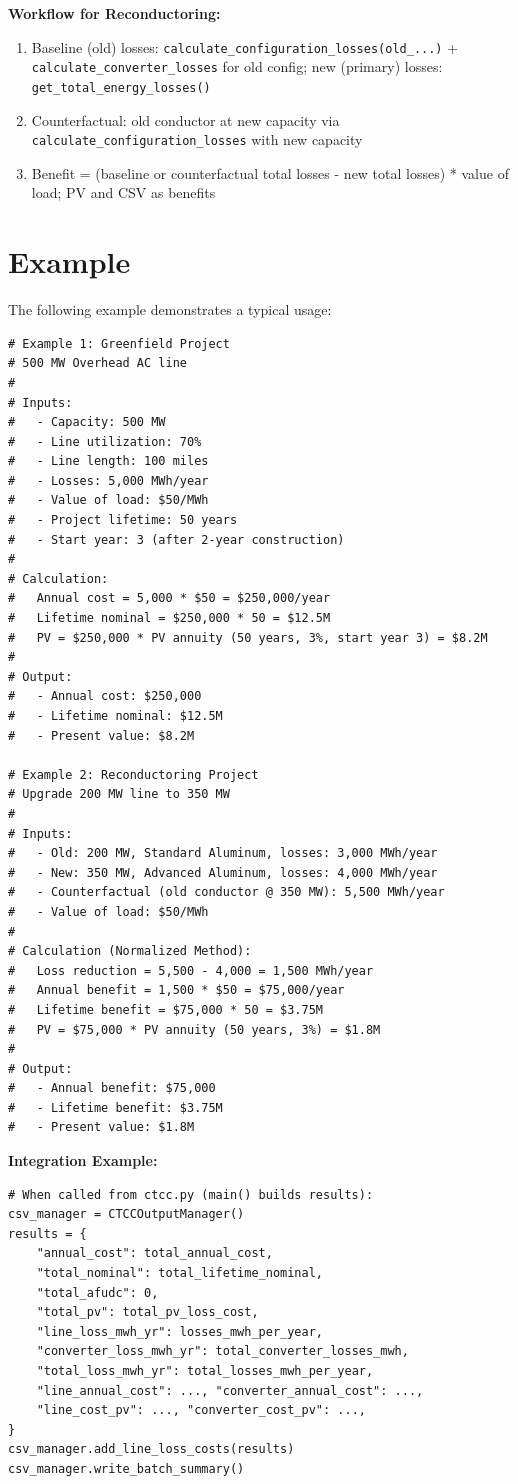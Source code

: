 \documentclass[ctcc_full_documentation.tex]{subfiles}
\begin{document}
\textbf{Workflow for Reconductoring:}
\begin{enumerate}
    \item Baseline (old) losses: \texttt{calculate\_configuration\_losses(old\_...)} + \texttt{calculate\_converter\_losses} for old config; new (primary) losses: \texttt{get\_total\_energy\_losses()}
    \item Counterfactual: old conductor at new capacity via \texttt{calculate\_configuration\_losses} with new capacity
    \item Benefit = (baseline or counterfactual total losses - new total losses) * value of load; PV and CSV as benefits
\end{enumerate}

\section{Example}

The following example demonstrates a typical usage:

\begin{lstlisting}
# Example 1: Greenfield Project
# 500 MW Overhead AC line
# 
# Inputs:
#   - Capacity: 500 MW
#   - Line utilization: 70%
#   - Line length: 100 miles
#   - Losses: 5,000 MWh/year
#   - Value of load: $50/MWh
#   - Project lifetime: 50 years
#   - Start year: 3 (after 2-year construction)
#
# Calculation:
#   Annual cost = 5,000 * $50 = $250,000/year
#   Lifetime nominal = $250,000 * 50 = $12.5M
#   PV = $250,000 * PV annuity (50 years, 3%, start year 3) = $8.2M
#
# Output:
#   - Annual cost: $250,000
#   - Lifetime nominal: $12.5M
#   - Present value: $8.2M

# Example 2: Reconductoring Project
# Upgrade 200 MW line to 350 MW
# 
# Inputs:
#   - Old: 200 MW, Standard Aluminum, losses: 3,000 MWh/year
#   - New: 350 MW, Advanced Aluminum, losses: 4,000 MWh/year
#   - Counterfactual (old conductor @ 350 MW): 5,500 MWh/year
#   - Value of load: $50/MWh
#
# Calculation (Normalized Method):
#   Loss reduction = 5,500 - 4,000 = 1,500 MWh/year
#   Annual benefit = 1,500 * $50 = $75,000/year
#   Lifetime benefit = $75,000 * 50 = $3.75M
#   PV = $75,000 * PV annuity (50 years, 3%) = $1.8M
#
# Output:
#   - Annual benefit: $75,000
#   - Lifetime benefit: $3.75M
#   - Present value: $1.8M
\end{lstlisting}

\textbf{Integration Example:}

\begin{lstlisting}
# When called from ctcc.py (main() builds results):
csv_manager = CTCCOutputManager()
results = {
    "annual_cost": total_annual_cost,
    "total_nominal": total_lifetime_nominal,
    "total_afudc": 0,
    "total_pv": total_pv_loss_cost,
    "line_loss_mwh_yr": losses_mwh_per_year,
    "converter_loss_mwh_yr": total_converter_losses_mwh,
    "total_loss_mwh_yr": total_losses_mwh_per_year,
    "line_annual_cost": ..., "converter_annual_cost": ...,
    "line_cost_pv": ..., "converter_cost_pv": ...,
}
csv_manager.add_line_loss_costs(results)
csv_manager.write_batch_summary()
\end{lstlisting}
\end{document}
